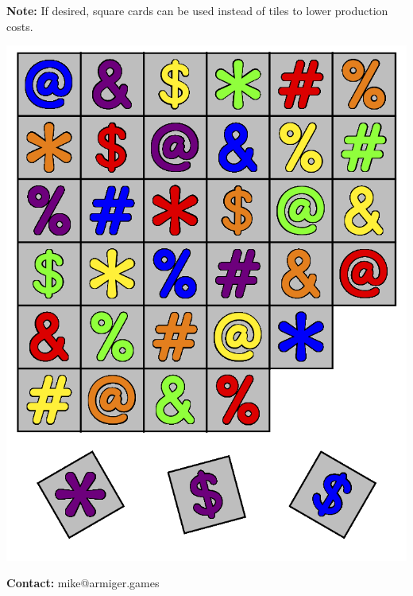 \documentclass[a5paper, DIV=18, 12pt]{scrartcl}
\begin{document}
\begin{multicols}{2}
\vspace{1ex}

\textbf{Note:} If desired, square cards can be used instead of tiles to lower production costs.

\vspace{1.75ex}

\includegraphics[width=0.95\columnwidth]{Images/cover_image.png}

\vspace{1.75ex}

\textbf{Contact:} mike@armiger.games
\end{multicols}
\end{document}
